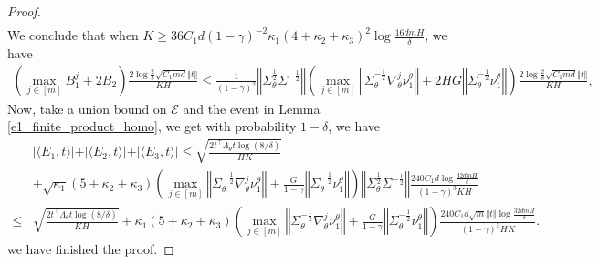 \documentclass{article}
\numberwithin{equation}{section}
\begin{document}
\begin{proof}
\begin{align*}
\end{align*}
We conclude that when $K\geq 36C_1d(1-\gamma)^{-2}\kappa_1(4+\kappa_2+\kappa_3)^2\log\frac{16dmH}{\delta}$, we have
\begin{align*}
    \left(\max_{j\in[m]}B_1^j+2B_2\right)\frac{2\log\frac{2}{\delta}\sqrt{C_1md}\Vert t\Vert}{KH}\leq \frac{1}{(1-\gamma)^2}\left\Vert\Sigma_\theta^{\frac{1}{2}}\Sigma^{-\frac{1}{2}}\right\Vert\left(\max_{j\in[m]}\left\Vert\Sigma_\theta^{-\frac{1}{2}}\nabla_\theta^j\nu^\theta_1\right\Vert+2HG\left\Vert\Sigma_\theta^{-\frac{1}{2}}\nu^\theta_1\right\Vert\right)\frac{2\log\frac{2}{\delta}\sqrt{C_1md}\Vert t\Vert}{KH},
\end{align*}
Now, take a union bound on $\mathcal{E}$ and the event in Lemma \ref{e1_finite_product_homo}, we get with probability $1-\delta$, we have
\begin{align*}
    &\vert\langle E_1,t\rangle\vert+\vert\langle E_2,t\rangle\vert+\vert \langle E_3, t\rangle\vert\leq\sqrt{\frac{2t^\top\Lambda_\theta t\log(8/\delta)}{HK}}\\
    &+\sqrt{\kappa_1}(5+\kappa_2+\kappa_3)\left(\max_{j\in[m]}\left\Vert\Sigma_\theta^{-\frac{1}{2}}\nabla_\theta^j\nu^\theta_1\right\Vert+\frac{G}{1-\gamma}\left\Vert\Sigma_\theta^{-\frac{1}{2}}\nu^\theta_1\right\Vert\right)\left\Vert\Sigma_\theta^{\frac{1}{2}}\Sigma^{-\frac{1}{2}}\right\Vert\frac{240C_1d\log\frac{32dmH}{\delta}}{(1-\gamma)^3KH}\\
    \leq&\sqrt{\frac{2t^\top\Lambda_\theta t\log(8/\delta)}{KH}}+\kappa_1(5+\kappa_2+\kappa_3)\left(\max_{j\in[m]}\left\Vert\Sigma_\theta^{-\frac{1}{2}}\nabla_\theta^j\nu^\theta_1\right\Vert+\frac{G}{1-\gamma}\left\Vert\Sigma_\theta^{-\frac{1}{2}}\nu^\theta_1\right\Vert\right)\frac{240C_1d\sqrt{m}\Vert t\Vert\log\frac{32dmH}{\delta}}{(1-\gamma)^3HK}.
\end{align*}
we have finished the proof. 
\end{proof}
\end{document}
